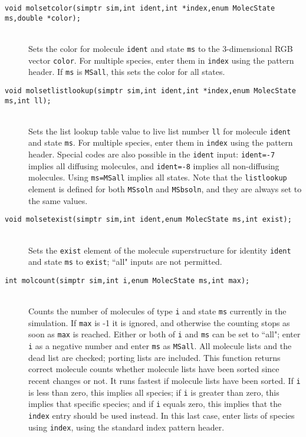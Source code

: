 \documentclass {book}
\begin{document}
\begin{description}
\item[\texttt{void molsetcolor(simptr sim,int ident,int *index,enum MolecState ms,double *color);}]
\hfill \\
Sets the color for molecule \texttt{ident} and state \texttt{ms} to the 3-dimensional RGB vector \texttt{color}. For multiple species, enter them in \texttt{index} using the pattern header. If \texttt{ms} is \texttt{MSall}, this sets the color for all states.

\item[\texttt{void molsetlistlookup(simptr sim,int ident,int *index,enum MolecState ms,int ll);}]
\hfill \\
Sets the list lookup table value to live list number \texttt{ll} for molecule \texttt{ident} and state \texttt{ms}. For multiple species, enter them in \texttt{index} using the pattern header. Special codes are also possible in the \texttt{ident} input: \texttt{ident=-7} implies all diffusing molecules, and \texttt{ident=-8} implies all non-diffusing molecules. Using \texttt{ms=MSall} implies all states. Note that the \texttt{listlookup} element is defined for both \texttt{MSsoln} and \texttt{MSbsoln}, and they are always set to the same values.

\item[\texttt{void molsetexist(simptr sim,int ident,enum MolecState ms,int exist);}]
\hfill \\
Sets the \texttt{exist} element of the molecule superstructure for identity \texttt{ident} and state \texttt{ms} to \texttt{exist}; ``all" inputs are not permitted.

\item[\texttt{int molcount(simptr sim,int i,enum MolecState ms,int max);}]
\hfill \\
Counts the number of molecules of type \texttt{i} and state \texttt{ms} currently in the simulation. If \texttt{max} is -1 it is ignored, and otherwise the counting stops as soon as \texttt{max} is reached. Either or both of \texttt{i} and \texttt{ms} can be set to ``all"; enter \texttt{i} as a negative number and enter \texttt{ms} as \texttt{MSall}. All molecule lists and the dead list are checked; porting lists are included. This function returns correct molecule counts whether molecule lists have been sorted since recent changes or not. It runs fastest if molecule lists have been sorted. If \texttt{i} is less than zero, this implies all species; if \texttt{i} is greater than zero, this implies that specific species; and if \texttt{i} equals zero, this implies that the \texttt{index} entry should be used instead. In this last case, enter lists of species using \texttt{index}, using the standard index pattern header.


\end{description}
\end{document}
